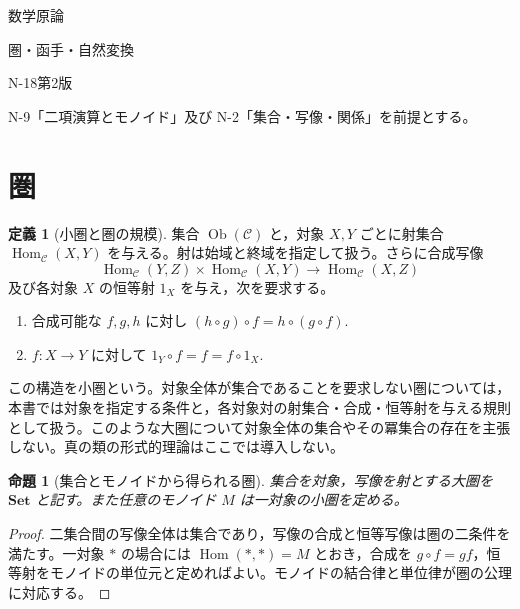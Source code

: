 \documentclass[a5paper,10pt,dvipdfmx]{jsarticle}
\theoremstyle{definition}
\newtheorem{defn}[ruledef]{定義}
\theoremstyle{plain}
\newtheorem{prop}[ruledef]{命題}
\begin{document}
\begin{center}
{\small 数学原論}\par\vspace{4mm}
{\LARGE 圏・函手・自然変換}\par\vspace{2mm}
{\small N-18\quad 第2版}
\end{center}
N-9「二項演算とモノイド」及び N-2「集合・写像・関係」を前提とする。
\section{圏}
\begin{defn}[小圏と圏の規模]\label{k241}
集合 $\operatorname{Ob}(\mathcal C)$ と，対象 $X,Y$ ごとに射集合 $\operatorname{Hom}_{\mathcal C}(X,Y)$ を与える。射は始域と終域を指定して扱う。さらに合成写像
\[
 \operatorname{Hom}_{\mathcal C}(Y,Z)\times
 \operatorname{Hom}_{\mathcal C}(X,Y)
 \longrightarrow\operatorname{Hom}_{\mathcal C}(X,Z)
\]
及び各対象 $X$ の恒等射 $1_X$ を与え，次を要求する。
\begin{enumerate}
\item 合成可能な $f,g,h$ に対し $(h\circ g)\circ f=h\circ(g\circ f)$.
\item $f:X\to Y$ に対して $1_Y\circ f=f=f\circ1_X$.
\end{enumerate}
この構造を小圏という。対象全体が集合であることを要求しない圏については，本書では対象を指定する条件と，各対象対の射集合・合成・恒等射を与える規則として扱う。このような大圏について対象全体の集合やその冪集合の存在を主張しない。真の類の形式的理論はここでは導入しない。
\end{defn}
\begin{prop}[集合とモノイドから得られる圏]\label{k242}
集合を対象，写像を射とする大圏を $\mathbf{Set}$ と記す。また任意のモノイド $M$ は一対象の小圏を定める。
\end{prop}
\begin{proof}
二集合間の写像全体は集合であり，写像の合成と恒等写像は圏の二条件を満たす。一対象 $\ast$ の場合には $\operatorname{Hom}(\ast,\ast)=M$ とおき，合成を $g\circ f=gf$，恒等射をモノイドの単位元と定めればよい。モノイドの結合律と単位律が圏の公理に対応する。
\end{proof}
\end{document}
